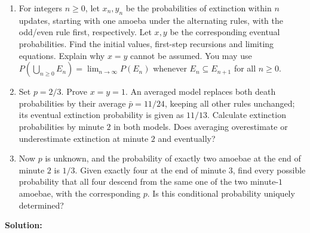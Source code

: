\documentclass[11pt,a4paper]{article}
\newcommand{\Prob}{P}
\begin{document}
\begin{enumerate}
\item For integers $n\geq0$, let $x_n,y_n$ be the probabilities of
extinction within $n$ updates, starting with one amoeba under the
alternating rules, with the odd/even rule first, respectively.
Let $x,y$ be the corresponding eventual probabilities.
Find the initial values, first-step recursions and limiting equations.
Explain why $x=y$ cannot be assumed.
You may use
\mbox{$\Prob(\bigcup_{n\geq0}E_n)
=\lim_{n\to\infty}\Prob(E_n)$}
whenever $E_n\subseteq E_{n+1}$ for all $n\geq0$.

\item Set $p=2/3$. Prove $x=y=1$. An averaged model replaces both
death probabilities by their average $\bar p=11/24$, keeping all
other rules unchanged; its eventual extinction probability is
given as $11/13$.
Calculate extinction probabilities by minute $2$ in both models.
Does averaging overestimate or underestimate extinction at minute $2$
and eventually?

\item Now $p$ is unknown, and the probability of exactly two amoebae
at the end of minute $2$ is $1/3$.
Given exactly four at the end of minute $3$, find every possible
probability that all four descend from the same one of the two
minute-$1$ amoebae, with the corresponding $p$.
Is this conditional probability uniquely determined?
\end{enumerate}

\noindent\textbf{Solution:}
\end{document}
